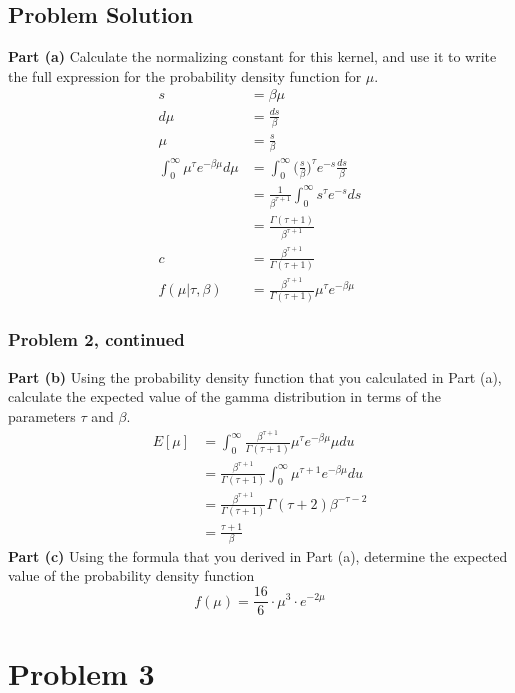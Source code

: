 \documentclass[12pt]{article}
\theoremstyle{definition}
\begin{document}
\subsection*{Problem Solution}

\noindent
{\bf Part (a)} Calculate the normalizing constant for this kernel, and use it to write the full expression for the probability density function for $\mu$.
\begin{align*}
s &= \beta\mu\\
d\mu &= \frac{ds}{\beta}\\
\mu &= \frac{s}{\beta}\\
\int_0^\infty \mu^\tau e^{-\beta\mu}d\mu &= \int_0^\infty \biggr(\frac{s}{\beta}\biggr)^\tau e^{-s}\frac{ds}{\beta}\\
&= \frac{1}{\beta^{\tau + 1}} \int_0^\infty s^\tau e^{-s}ds\\
&= \frac{\Gamma(\tau + 1)}{\beta^{\tau + 1}}\\
c &= \frac{\beta^{\tau + 1}}{\Gamma(\tau + 1)}\\
f(\mu|\tau, \beta) &= \frac{\beta^{\tau + 1}}{\Gamma(\tau + 1)} \mu^\tau e^{-\beta\mu}
\end{align*}
\newpage
\subsubsection*{Problem 2, continued}

\noindent
{\bf Part (b)} Using the probability density function that you calculated in Part (a), calculate the expected value of the gamma distribution in terms of the parameters $\tau$ and $\beta$.
\begin{align*}
E[\mu] &= \int_0^\infty \frac{\beta^{\tau + 1}}{\Gamma(\tau + 1)} \mu^\tau e^{-\beta\mu} \mu du\\
&= \frac{\beta^{\tau + 1}}{\Gamma(\tau + 1)} \int_0^\infty \mu^{\tau + 1} e^{-\beta\mu} du\\
&= \frac{\beta^{\tau + 1}}{\Gamma(\tau + 1)} \Gamma(\tau + 2)\beta^{-\tau - 2}\\
&= \frac{\tau + 1}{\beta}
\end{align*}
\noindent
{\bf Part (c)} Using the formula that you derived in Part (a), determine the expected value of the probability density function
$$
f(\mu) = \frac{16}{6} \cdot \mu^3 \cdot e^{-2\mu}
$$


\newpage
\section*{Problem 3}
\end{document}
